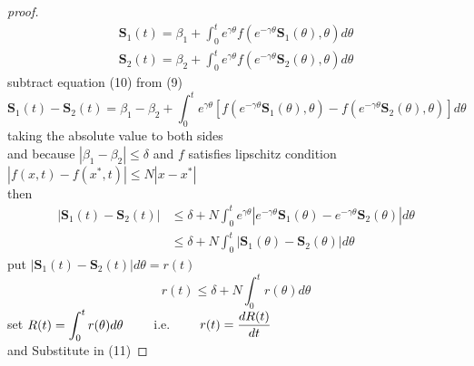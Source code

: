 \documentclass[]{article}
\begin{document}
\begin{proof}[proof]
    \begin{align}
        \mathbf{S}_1(t) = \beta_1 + \int_{0}^{t}e^{\gamma \theta}f(e^{-\gamma \theta}\mathbf{S}_1(\theta),\theta)d\theta
        \\
        \mathbf{S}_2(t) = \beta_2 + \int_{0}^{t}e^{\gamma \theta}f(e^{-\gamma \theta}\mathbf{S}_2(\theta),\theta)d\theta
    \end{align}
subtract equation (10) from (9)
\[
    \mathbf{S}_1(t) - \mathbf{S}_2(t) = \beta_1 - \beta_2 + \int_{0}^{t} e^{\gamma \theta}\left[ f(e^{-\gamma \theta}\mathbf{S}_1(\theta),\theta) - f(e^{-\gamma \theta}\mathbf{S}_2(\theta),\theta)\right]d\theta    
\]
taking the absolute value to both sides
\\
and because $\left\lvert \beta_1 - \beta_2 \right\rvert \leq \delta $
and $f$ satisfies lipschitz condition $\left\lvert f(x,t) - f(x^*,t)\right\rvert \leq N\left\lvert x - x^*\right\rvert$
\\
then
\begin{align*}
    |\mathbf{S}_1(t) - \mathbf{S}_2(t)| &\leq \delta  + N \int_{0}^{t} e^{\gamma \theta} \left\lvert e^{-\gamma \theta}\mathbf{S}_1(\theta) -e^{-\gamma \theta} \mathbf{S}_2(\theta) \right\rvert d\theta    
    \\
    &\leq \delta  + N \int_{0}^{t} \left\lvert \mathbf{S}_1(\theta) - \mathbf{S}_2(\theta) \right\rvert d\theta    
\end{align*}
put $\left\lvert \mathbf{S}_1(t) - \mathbf{S}_2(t) \right\rvert d\theta = r(t)$
\begin{equation}
    r(t) \leq \delta  + N \int_{0}^{t} r(\theta) d\theta    
\end{equation}
set $\displaystyle R(t) = \int_{0}^{t} r(\theta)d\theta \quad\quad$ i.e. $\quad\quad \displaystyle r(t) = \frac{dR(t)}{dt} $
\\ and Substitute in (11)




\end{proof}
\end{document}
